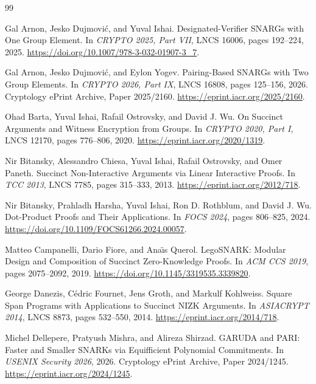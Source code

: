 \documentclass[11pt]{article}
\theoremstyle{definition}
\begin{document}
\begin{thebibliography}{99}

Gal Arnon, Jesko Dujmovi\'c, and Yuval Ishai.
\newblock Designated-Verifier SNARGs with One Group Element.
\newblock In \emph{CRYPTO 2025, Part VII}, LNCS 16006, pages 192--224, 2025.
\newblock \url{https://doi.org/10.1007/978-3-032-01907-3_7}.

Gal Arnon, Jesko Dujmovi\'c, and Eylon Yogev.
\newblock Pairing-Based SNARGs with Two Group Elements.
\newblock In \emph{CRYPTO 2026, Part IX}, LNCS 16808, pages 125--156, 2026.
\newblock Cryptology ePrint Archive, Paper 2025/2160.
\newblock \url{https://eprint.iacr.org/2025/2160}.

Ohad Barta, Yuval Ishai, Rafail Ostrovsky, and David J. Wu.
\newblock On Succinct Arguments and Witness Encryption from Groups.
\newblock In \emph{CRYPTO 2020, Part I}, LNCS 12170, pages 776--806, 2020.
\newblock \url{https://eprint.iacr.org/2020/1319}.

Nir Bitansky, Alessandro Chiesa, Yuval Ishai, Rafail Ostrovsky, and
Omer Paneth.
\newblock Succinct Non-Interactive Arguments via Linear Interactive Proofs.
\newblock In \emph{TCC 2013}, LNCS 7785, pages 315--333, 2013.
\newblock \url{https://eprint.iacr.org/2012/718}.

Nir Bitansky, Prahladh Harsha, Yuval Ishai, Ron D. Rothblum, and David J. Wu.
\newblock Dot-Product Proofs and Their Applications.
\newblock In \emph{FOCS 2024}, pages 806--825, 2024.
\newblock \url{https://doi.org/10.1109/FOCS61266.2024.00057}.

Matteo Campanelli, Dario Fiore, and Ana\"{\i}s Querol.
\newblock LegoSNARK: Modular Design and Composition of Succinct
Zero-Knowledge Proofs.
\newblock In \emph{ACM CCS 2019}, pages 2075--2092, 2019.
\newblock \url{https://doi.org/10.1145/3319535.3339820}.

George Danezis, C\'{e}dric Fournet, Jens Groth, and Markulf Kohlweiss.
\newblock Square Span Programs with Applications to Succinct NIZK Arguments.
\newblock In \emph{ASIACRYPT 2014}, LNCS 8873, pages 532--550, 2014.
\newblock \url{https://eprint.iacr.org/2014/718}.

Michel Dellepere, Pratyush Mishra, and Alireza Shirzad.
\newblock GARUDA and PARI: Faster and Smaller SNARKs via Equifficient
Polynomial Commitments.
\newblock In \emph{USENIX Security 2026}, 2026.
\newblock Cryptology ePrint Archive, Paper 2024/1245.
\newblock \url{https://eprint.iacr.org/2024/1245}.


\end{thebibliography}
\end{document}
